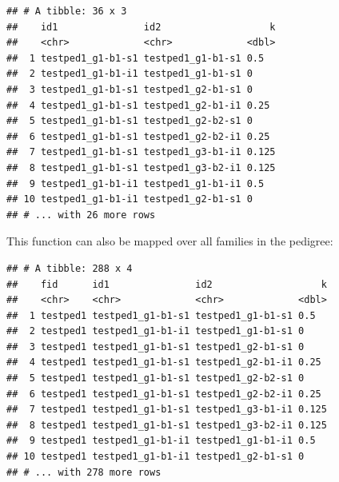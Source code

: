 \documentclass[9pt,a4paper,]{extarticle}
\newenvironment{Shaded}{\begin{snugshade}}{\end{snugshade}}
\newcommand{\DataTypeTok}[1]{\textcolor[rgb]{0.13,0.29,0.53}{#1}}
\newcommand{\KeywordTok}[1]{\textcolor[rgb]{0.13,0.29,0.53}{\textbf{#1}}}
\newcommand{\NormalTok}[1]{#1}
\newcommand{\OperatorTok}[1]{\textcolor[rgb]{0.81,0.36,0.00}{\textbf{#1}}}
\newcommand{\StringTok}[1]{\textcolor[rgb]{0.31,0.60,0.02}{#1}}
\begin{document}
\begin{verbatim}
## # A tibble: 36 x 3
##    id1               id2                   k
##    <chr>             <chr>             <dbl>
##  1 testped1_g1-b1-s1 testped1_g1-b1-s1 0.5  
##  2 testped1_g1-b1-i1 testped1_g1-b1-s1 0    
##  3 testped1_g1-b1-s1 testped1_g2-b1-s1 0    
##  4 testped1_g1-b1-s1 testped1_g2-b1-i1 0.25 
##  5 testped1_g1-b1-s1 testped1_g2-b2-s1 0    
##  6 testped1_g1-b1-s1 testped1_g2-b2-i1 0.25 
##  7 testped1_g1-b1-s1 testped1_g3-b1-i1 0.125
##  8 testped1_g1-b1-s1 testped1_g3-b2-i1 0.125
##  9 testped1_g1-b1-i1 testped1_g1-b1-i1 0.5  
## 10 testped1_g1-b1-i1 testped1_g2-b1-s1 0    
## # ... with 26 more rows
\end{verbatim}

This function can also be mapped over all families in the pedigree:

\begin{Shaded}
\end{Shaded}

\begin{verbatim}
## # A tibble: 288 x 4
##    fid      id1               id2                   k
##    <chr>    <chr>             <chr>             <dbl>
##  1 testped1 testped1_g1-b1-s1 testped1_g1-b1-s1 0.5  
##  2 testped1 testped1_g1-b1-i1 testped1_g1-b1-s1 0    
##  3 testped1 testped1_g1-b1-s1 testped1_g2-b1-s1 0    
##  4 testped1 testped1_g1-b1-s1 testped1_g2-b1-i1 0.25 
##  5 testped1 testped1_g1-b1-s1 testped1_g2-b2-s1 0    
##  6 testped1 testped1_g1-b1-s1 testped1_g2-b2-i1 0.25 
##  7 testped1 testped1_g1-b1-s1 testped1_g3-b1-i1 0.125
##  8 testped1 testped1_g1-b1-s1 testped1_g3-b2-i1 0.125
##  9 testped1 testped1_g1-b1-i1 testped1_g1-b1-i1 0.5  
## 10 testped1 testped1_g1-b1-i1 testped1_g2-b1-s1 0    
## # ... with 278 more rows
\end{verbatim}
\end{document}
